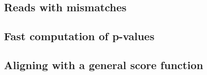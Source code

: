 
\subsection{Reads with mismatches}





\subsection{Fast computation of p-values}





\subsection{Aligning with a general score function}





